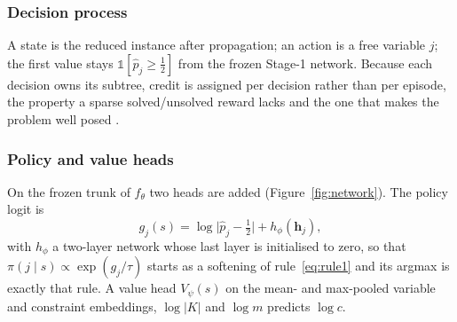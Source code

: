 \documentclass[final,5p,times,twocolumn,authoryear]{elsarticle}
\begin{document}
\subsubsection{Decision process}
A state is the reduced instance after propagation; an action is a free variable $j$; the first value stays $\mathbb{1}[\hat p_j\ge\frac12]$ from the frozen Stage-1 network. Because each decision owns its subtree, credit is assigned per decision rather than per episode, the property a sparse solved/unsolved reward lacks and the one that makes the problem well posed \citep{etheve2020reinforcement}.

\subsubsection{Policy and value heads}
On the frozen trunk of $f_\theta$ two heads are added (Figure~\ref{fig:network}). The policy logit is
\begin{equation}
g_j(s)=\log\bigl|\hat p_j-\tfrac12\bigr|+h_\phi(\mathbf{h}_j),
\label{eq:policy}
\end{equation}
with $h_\phi$ a two-layer network whose last layer is initialised to zero, so that $\pi(j\mid s)\propto\exp(g_j/\tau)$ starts as a softening of rule~\eqref{eq:rule1} and its argmax is exactly that rule. A value head $V_\psi(s)$ on the mean- and max-pooled variable and constraint embeddings, $\log|K|$ and $\log m$ predicts $\log c$.
\end{document}
